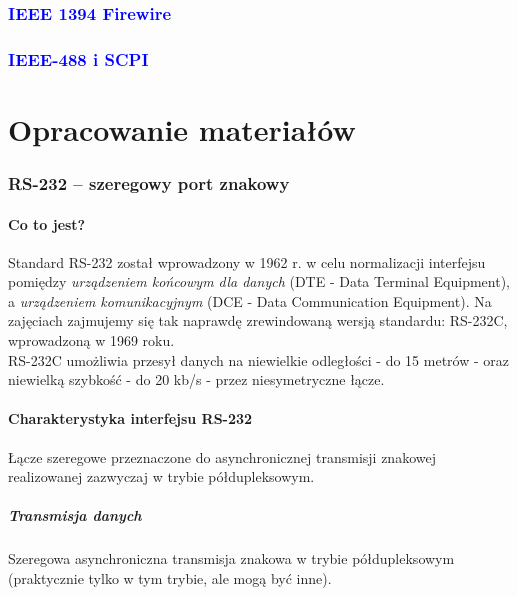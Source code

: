 \documentclass[a4paper,twoside]{article}
\begin{document}
\section{\textcolor{blue}{IEEE 1394 Firewire}}

\section{\textcolor{blue}{IEEE-488 i SCPI}}


\pagebreak
\part{Opracowanie materiałów}

\section{RS-232 – szeregowy port znakowy}
	\subsection{Co to jest?}
	Standard RS-232 został wprowadzony w 1962 r. w celu normalizacji interfejsu pomiędzy \textit{urządzeniem końcowym dla danych} (DTE - Data Terminal Equipment), a \textit{urządzeniem komunikacyjnym} (DCE - Data Communication Equipment). Na zajęciach zajmujemy się tak naprawdę zrewindowaną wersją standardu: RS-232C, wprowadzoną w 1969 roku.\\
	RS-232C umożliwia przesył danych na niewielkie odległości - do 15 metrów - oraz niewielką szybkość - do 20 kb/s - przez niesymetryczne łącze.
	\subsection{Charakterystyka interfejsu RS-232}
		Łącze szeregowe przeznaczone do asynchronicznej transmisji znakowej realizowanej zazwyczaj w trybie półdupleksowym.
		\subsubsection{Transmisja danych}
		Szeregowa asynchroniczna transmisja znakowa w trybie półdupleksowym (praktycznie tylko w tym trybie, ale mogą być inne).
\end{document}
